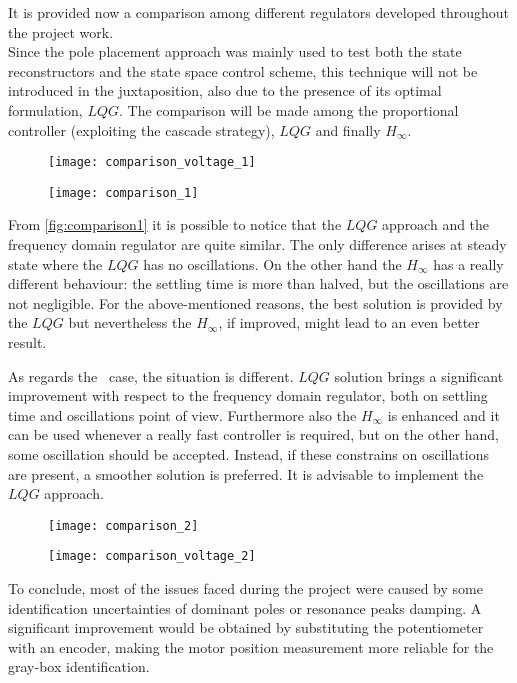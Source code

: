 It is provided now a comparison among different regulators developed throughout the project work. \\ Since the pole placement approach was mainly used to test both the state reconstructors and the state space control scheme, this technique will not be introduced in the juxtaposition, also due to the presence of its optimal formulation, $LQG$.
The comparison will be made among the proportional controller (exploiting the cascade strategy), $LQG$ and finally $H_{\infty}$.
\begin{figure*}[h]
	\centering
	\begin{subfigure}{0.45\columnwidth}
		\texttt{[image: comparison\_voltage\_1]}
	\end{subfigure}
	\begin{subfigure}{0.45\columnwidth}
		\texttt{[image: comparison\_1]}
	\end{subfigure}
	\caption{Different control tecnhiques for the \onedof\ case}
	\label{fig:comparison1}
\end{figure*}

\par From \cref{fig:comparison1} it is possible to notice that the $LQG$ approach and the frequency domain regulator are quite similar. The only difference arises at steady state where the $LQG$ has no oscillations. On the other hand the $H_{\infty}$ has a really different behaviour: the settling time is more than halved, but the oscillations are not negligible. For the above-mentioned reasons, the best solution is provided by the $LQG$ but nevertheless the $H_{\infty}$, if improved, might lead to an even better result.
\par
As regards the \twodof\ case, the situation is different. $LQG$ solution brings a significant improvement with respect to the frequency domain regulator, both on settling time and oscillations point of view. Furthermore also the $H_{\infty}$ is enhanced and it can be used whenever a really fast controller is required, but on the other hand, some oscillation should be accepted. Instead, if these constrains on oscillations are present, a smoother solution is preferred. It is advisable to implement the $LQG$ approach.

\begin{figure*}[h]
	\centering
	\begin{subfigure}{0.45\columnwidth}
		\texttt{[image: comparison\_2]}
	\end{subfigure}
	\begin{subfigure}{0.45\columnwidth}
		\texttt{[image: comparison\_voltage\_2]}
	\end{subfigure}
	\caption{Different control techniques for the \twodof\ case}
	\label{fig:comparison2}
\end{figure*}
\par
To conclude, most of the issues faced during the project were caused by some identification uncertainties of dominant poles or resonance peaks damping.
A significant improvement would be obtained by substituting the potentiometer with an encoder, making the motor position measurement more reliable for the gray-box identification.